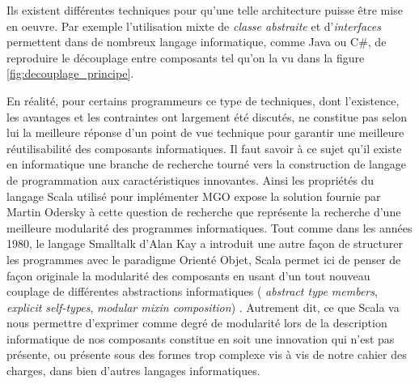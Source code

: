 Ils existent différentes techniques pour qu'une telle architecture puisse être mise en oeuvre. Par exemple l'utilisation mixte de \textit{classe abstraite} et d'\textit{interfaces} permettent dans de nombreux langage informatique, comme Java ou C\#, de reproduire le découplage entre composants tel qu'on la vu dans la figure \ref{fig:decouplage_principe}.

En réalité, pour certains programmeurs \textcite{Odersky2005}  ce type de techniques, dont l'existence, les avantages et les contraintes ont largement été discutés, ne constitue pas selon lui la meilleure réponse d'un point de vue technique pour garantir une meilleure réutilisabilité des composants informatiques. Il faut savoir à ce sujet qu'il existe en informatique une branche de recherche tourné vers la construction de langage de programmation aux caractéristiques innovantes. Ainsi les propriétés du langage Scala utilisé pour implémenter MGO expose la solution fournie par Martin Odersky à cette question de recherche que représente la recherche d'une meilleure modularité des programmes informatiques. Tout comme dans les années 1980, le langage Smalltalk d'Alan Kay a introduit une autre façon de structurer les programmes avec le paradigme Orienté Objet, Scala permet ici de penser de façon originale la modularité des composants en usant d'un tout nouveau couplage de différentes abstractions informatiques ( \textit{abstract type members}, \textit{explicit self-types}, \textit{modular mixin composition}) . Autrement dit, ce que Scala va nous permettre d'exprimer comme degré de modularité lors de la description informatique de nos composants constitue en soit une innovation qui n'est pas présente, ou présente sous des formes trop complexe vis à vis de notre cahier des charges, dans bien d'autres langages informatiques.



